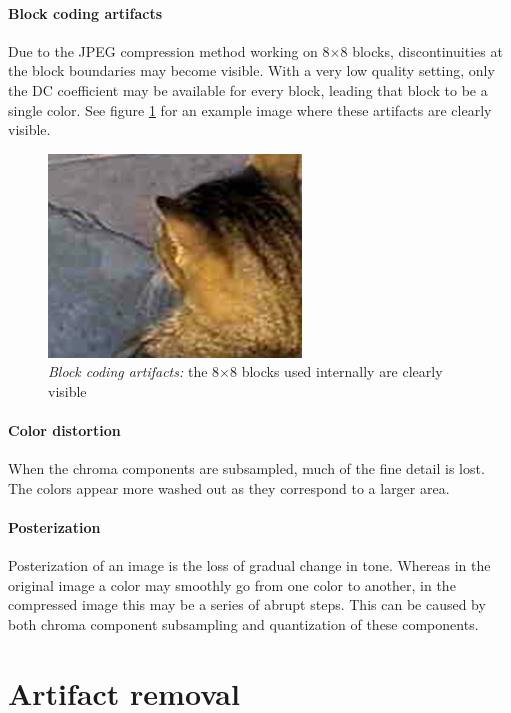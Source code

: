 \paragraph{Block coding artifacts}
Due to the JPEG compression method working on 8$\times$8 blocks, discontinuities at the block boundaries may become visible. With a very low quality setting, only the DC coefficient may be available for every block, leading that block to be a single color. See figure \ref{fig:bc} for an example image where these artifacts are clearly visible.


\begin{figure}[ht]
    \centering
        \includegraphics[width=0.6\textwidth]{../graphics/blocking.png}
    \caption[Short caption to special figure]{\textit{Block coding artifacts:} the 8$\times$8 blocks used internally are clearly visible}
    \label{fig:bc}
\end{figure}



\paragraph{Color distortion}
When the chroma components are subsampled, much of the fine detail is lost. The colors appear more washed out as they correspond to a larger area.

\paragraph{Posterization}
Posterization of an image is the loss of gradual change in tone. Whereas in the original image a color may smoothly go from one color to another, in the compressed image this may be a series of abrupt steps. This can be caused by both chroma component subsampling and quantization of these components. 


\section{Artifact removal}


